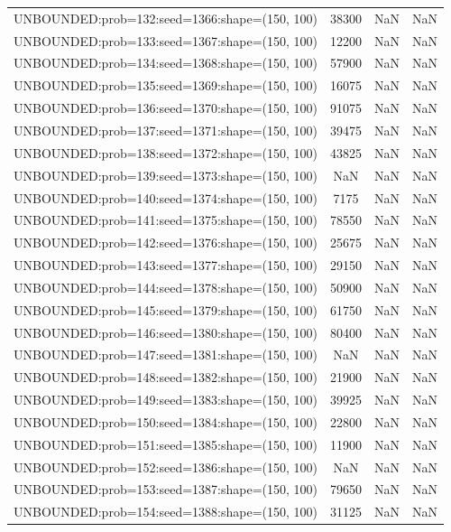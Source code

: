 \begin{longtable}{lccc}
UNBOUNDED:prob=132:seed=1366:shape=(150, 100) & 38300 &   NaN &    NaN \\
UNBOUNDED:prob=133:seed=1367:shape=(150, 100) & 12200 &   NaN &    NaN \\
UNBOUNDED:prob=134:seed=1368:shape=(150, 100) & 57900 &   NaN &    NaN \\
UNBOUNDED:prob=135:seed=1369:shape=(150, 100) & 16075 &   NaN &    NaN \\
UNBOUNDED:prob=136:seed=1370:shape=(150, 100) & 91075 &   NaN &    NaN \\
UNBOUNDED:prob=137:seed=1371:shape=(150, 100) & 39475 &   NaN &    NaN \\
UNBOUNDED:prob=138:seed=1372:shape=(150, 100) & 43825 &   NaN &    NaN \\
UNBOUNDED:prob=139:seed=1373:shape=(150, 100) &   NaN &   NaN &    NaN \\
UNBOUNDED:prob=140:seed=1374:shape=(150, 100) &  7175 &   NaN &    NaN \\
UNBOUNDED:prob=141:seed=1375:shape=(150, 100) & 78550 &   NaN &    NaN \\
UNBOUNDED:prob=142:seed=1376:shape=(150, 100) & 25675 &   NaN &    NaN \\
UNBOUNDED:prob=143:seed=1377:shape=(150, 100) & 29150 &   NaN &    NaN \\
UNBOUNDED:prob=144:seed=1378:shape=(150, 100) & 50900 &   NaN &    NaN \\
UNBOUNDED:prob=145:seed=1379:shape=(150, 100) & 61750 &   NaN &    NaN \\
UNBOUNDED:prob=146:seed=1380:shape=(150, 100) & 80400 &   NaN &    NaN \\
UNBOUNDED:prob=147:seed=1381:shape=(150, 100) &   NaN &   NaN &    NaN \\
UNBOUNDED:prob=148:seed=1382:shape=(150, 100) & 21900 &   NaN &    NaN \\
UNBOUNDED:prob=149:seed=1383:shape=(150, 100) & 39925 &   NaN &    NaN \\
UNBOUNDED:prob=150:seed=1384:shape=(150, 100) & 22800 &   NaN &    NaN \\
UNBOUNDED:prob=151:seed=1385:shape=(150, 100) & 11900 &   NaN &    NaN \\
UNBOUNDED:prob=152:seed=1386:shape=(150, 100) &   NaN &   NaN &    NaN \\
UNBOUNDED:prob=153:seed=1387:shape=(150, 100) & 79650 &   NaN &    NaN \\
UNBOUNDED:prob=154:seed=1388:shape=(150, 100) & 31125 &   NaN &    NaN \\

\end{longtable}
